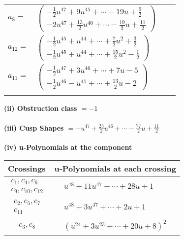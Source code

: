 \documentclass[1p]{elsarticle_modified}
\theoremstyle{definition}
\begin{document}
\begin{tabular}{m{7pt} m{180pt} m{7pt} m{180pt} }
\flushright $a_{8}=$&$\begin{pmatrix}-\frac{1}{2} u^{47}+9 u^{45}+\cdots-19 u+\frac{9}{2}\\-2 u^{47}+\frac{13}{2} u^{46}+\cdots-\frac{19}{2} u+\frac{11}{2}\end{pmatrix}$ \\
\flushright $a_{12}=$&$\begin{pmatrix}-\frac{1}{2} u^{45}+u^{44}+\cdots+\frac{7}{2} u^2+\frac{3}{2}\\-\frac{1}{2} u^{45}+u^{44}+\cdots+\frac{15}{2} u^2-\frac{1}{2}\end{pmatrix}$ \\
\flushright $a_{11}=$&$\begin{pmatrix}-\frac{1}{2} u^{47}+3 u^{46}+\cdots+7 u-5\\-\frac{1}{2} u^{46}- u^{45}+\cdots+\frac{13}{2} u-2\end{pmatrix}$\\&\end{tabular}
\flushleft \textbf{(ii) Obstruction class $= -1$}\\~\\
\flushleft \textbf{(iii) Cusp Shapes $= - u^{47}+\frac{23}{2} u^{46}+\cdots-\frac{77}{2} u+\frac{11}{2}$}\\~\\
\newpage\renewcommand{\arraystretch}{1}
\flushleft \textbf{(iv) u-Polynomials at the component}\newline \\
\begin{tabular}{m{50pt}|m{274pt}}
Crossings & \hspace{64pt}u-Polynomials at each crossing \\
\hline $$\begin{aligned}c_{1},c_{4},c_{6}\\c_{9},c_{10},c_{12}\end{aligned}$$&$\begin{aligned}
&u^{48}+11 u^{47}+\cdots+28 u+1
\end{aligned}$\\
\hline $$\begin{aligned}c_{2},c_{5},c_{7}\\c_{11}\end{aligned}$$&$\begin{aligned}
&u^{48}+3 u^{47}+\cdots+2 u+1
\end{aligned}$\\
\hline $$\begin{aligned}c_{3},c_{8}\end{aligned}$$&$\begin{aligned}
&(u^{24}+3 u^{23}+\cdots+20 u+8)^{2}
\end{aligned}$\\
\hline
\end{tabular}\\~\\
\end{document}
